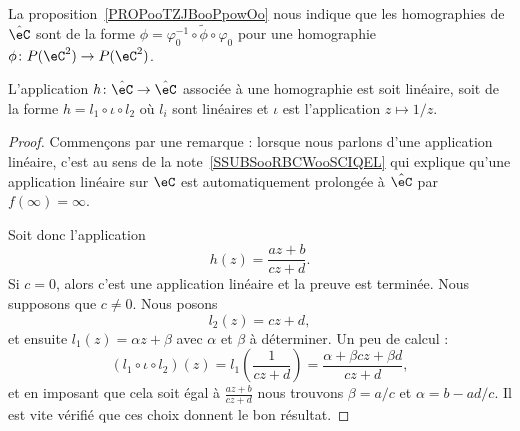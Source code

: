 \begin{normaltext}      \label{NORMooCVYKooYvjIeE}
	La proposition~\ref{PROPooTZJBooPpowOo} nous indique que les homographies de \( \hat \eC\) sont de la forme \( \phi=\varphi_0^{-1}\circ\tilde \phi\circ\varphi_0\) pour une homographie \( \phi\colon P(\eC^2)\to P(\eC^2)\).
\end{normaltext}

\begin{proposition}      \label{PROPooSQFOooRginjJ}
	L'application \( h\colon \hat\eC\to \hat \eC\) associée à une homographie est soit linéaire, soit de la forme \( h=l_1\circ \iota\circ l_2\) où \( l_i\) sont linéaires et \( \iota\) est l'application \( z\mapsto 1/z\).
\end{proposition}

\begin{proof}
	Commençons par une remarque : lorsque nous parlons d'une application linéaire, c'est au sens de la note~\ref{SSUBSooRBCWooSCIQEL} qui explique qu'une application linéaire sur \( \eC\) est automatiquement prolongée à \( \hat \eC\) par \( f(\infty)=\infty\).

	Soit donc l'application
	\begin{equation}
		h(z)=\frac{ az+b }{ cz+d }.
	\end{equation}
	Si \( c=0\), alors c'est une application linéaire et la preuve est terminée. Nous supposons que \( c\neq 0\). Nous posons
	\begin{equation}
		l_2(z)=cz+d,
	\end{equation}
	et ensuite \( l_1(z)=\alpha z+\beta\) avec \( \alpha\) et \( \beta\) à déterminer. Un peu de calcul :
	\begin{equation}
		(l_1\circ \iota\circ l_2)(z)=l_1\left( \frac{1}{ cz+d } \right)=\frac{ \alpha+\beta c z+\beta d }{ cz+d },
	\end{equation}
	et en imposant que cela soit égal à \( \frac{ az+b }{ cz+d }\) nous trouvons \( \beta=a/c\) et \( \alpha=b-ad/c\). Il est vite vérifié que ces choix donnent le bon résultat.
\end{proof}

